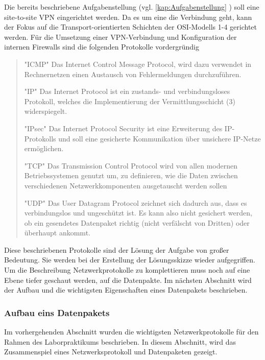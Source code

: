 \documentclass[
a4paper,     %
 headsepline, %
footsepline, %
titlepage,   %
 halfparskip,     %
 fleqn,       %
12pt         %
]{scrartcl}  %
\begin{document}
Die bereits beschriebene Aufgabenstellung (vgl. \ref{kap:Aufgabenstellung} ) soll eine site-to-site VPN eingerichtet werden. Da es um eine die Verbindung geht, kann der Fokus auf die Transport-orientierten Schichten der OSI-Modells 1-4 gerichtet werden. Für die Umsetzung einer VPN-Verbindung und Konfiguration der internen Firewalls sind die folgenden Protokolle vordergründig
\begin{quotation}
\item ["ICMP"] Das Internet Control Message Protocol, wird dazu verwendet in Rechnernetzen einen Austausch von Fehlermeldungen durchzuführen. 
\item ["IP"] Das Internet Protocol ist ein zustands- und verbindungsloses Protokoll, welches die Implementierung der Vermittlungsschicht (3) widerspiegelt. 
\item ["IPsec"] Das Internet Protocol Security ist eine Erweiterung des IP-Protokolls und soll eine gesicherte Kommunikation über unsichere IP-Netze ermöglichen.  
\item ["TCP"] Das Transmission Control Protocol wird von allen modernen Betriebssystemen genutzt um, zu definieren, wie die Daten zwischen verschiedenen Netzwerkkomponenten ausgetauscht werden sollen 
\item ["UDP"] Das User Datagram Protocol zeichnet sich dadurch aus, dass es verbindungslos und ungeschützt ist. Es kann also nicht gesichert werden, ob ein gesendetes Datenpaket richtig (nicht verfälscht von Dritten) oder überhaupt  ankommt. \cite{Kurose2008Computernetzwerke}
\end{quotation}
Diese beschriebenen Protokolle sind der Lösung der Aufgabe von großer Bedeutung. Sie werden bei der Erstellung der Lösungsskizze wieder aufgegriffen. Um die Beschreibung Netzwerkprotokolle zu komplettieren muss noch auf eine Ebene tiefer geschaut werden, auf die Datenpakte. Im nächsten Abschnitt wird der Aufbau und die wichtigsten Eigenschaften eines Datenpakets beschrieben. 

\subsubsection{Aufbau eins Datenpakets}
Im vorhergehenden Abschnitt wurden die wichtigsten Netzwerkprotokolle für den Rahmen des Laborpraktikums beschrieben. In diesem Abschnitt, wird das Zusammenspiel eines Netzwerksprotokoll und Datenpaketen gezeigt. 
 
\end{document}
